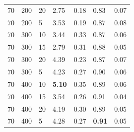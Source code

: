 \documentclass{article}
\begin{document}
\begin{table}[h]
\begin{tabular}{l l l l l l l}
70 & 200 & 20 & 2.75 & 0.18 & 0.83 & 0.07 \\
70 & 200 & 5 & 3.53 & 0.19 & 0.87 & 0.08 \\
70 & 300 & 10 & 3.44 & 0.33 & 0.87 & 0.06 \\
70 & 300 & 15 & 2.79 & 0.31 & 0.88 & 0.05 \\
70 & 300 & 20 & 4.39 & 0.23 & 0.87 & 0.07 \\
70 & 300 & 5 & 4.23 & 0.27 & 0.90 & 0.06 \\
70 & 400 & 10 & \textbf{5.10} & 0.35 & 0.89 & 0.06 \\
70 & 400 & 15 & 3.54 & 0.26 & 0.91 & 0.04 \\
70 & 400 & 20 & 4.19 & 0.30 & 0.89 & 0.05 \\
70 & 400 & 5 & 4.28 & 0.27 & \textbf{0.91} & 0.05 \\
\bottomrule
\end{tabular}
\end{table}
\end{document}
